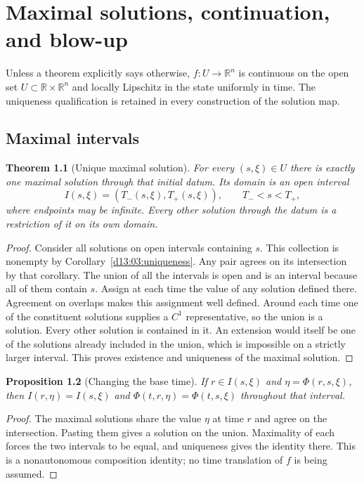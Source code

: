 \documentclass[11pt,oneside]{book}
\newtheorem{theorem}{Theorem}[chapter]
\newtheorem{proposition}[theorem]{Proposition}
\theoremstyle{definition}
\theoremstyle{remark}\newtheorem{remark}[theorem]{Remark}
\newcommand{\R}{\mathbb R}\newcommand{\C}{\mathbb C}
\begin{document}


\chapter{Maximal solutions, continuation, and blow-up}\label{ch:d13-04}

Unless a theorem explicitly says otherwise, $f:U\to\R^n$ is continuous
on the open set $U\subset\R\times\R^n$ and locally Lipschitz in the
state uniformly in time. The uniqueness qualification is retained in
every construction of the solution map.

\section{Maximal intervals}
\begin{theorem}[Unique maximal solution]\label{d13:04:maximal}
For every $(s,\xi)\in U$ there is exactly one maximal solution through
that initial datum. Its domain is an open interval
\[
 I(s,\xi)=(T_-(s,\xi),T_+(s,\xi)),\qquad T_-<s<T_+,
\]
where endpoints may be infinite. Every other solution through the datum
is a restriction of it on its own domain.
\end{theorem}
\begin{proof}
Consider all solutions on open intervals containing $s$. This collection
is nonempty by Corollary~\ref{d13:03:uniqueness}. Any pair agrees on its
intersection by that corollary. The union of all the intervals is open
and is an interval because all of them contain $s$. Assign at each time
the value of any solution defined there. Agreement on overlaps makes
this assignment well defined. Around each time one of the constituent
solutions supplies a $C^1$ representative, so the union is a solution.
Every other solution is contained in it. An extension would itself be
one of the solutions already included in the union, which is impossible
on a strictly larger interval. This proves existence and uniqueness of
the maximal solution.
\end{proof}

\begin{proposition}[Changing the base time]\label{d13:04:rebase}
If $r\in I(s,\xi)$ and $\eta=\Phi(r,s,\xi)$, then
$I(r,\eta)=I(s,\xi)$ and
$\Phi(t,r,\eta)=\Phi(t,s,\xi)$ throughout that interval.
\end{proposition}
\begin{proof}
The maximal solutions share the value $\eta$ at time $r$ and agree on
the intersection. Pasting them gives a solution on the union. Maximality
of each forces the two intervals to be equal, and uniqueness gives the
identity there. This is a nonautonomous composition identity; no time
translation of $f$ is being assumed.
\end{proof}
\end{document}
